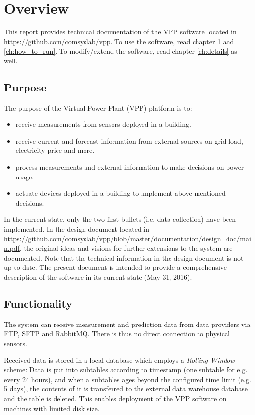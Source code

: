\chapter{Overview} \label{ch:overview}

This report provides technical documentation of the VPP software located in \url{https://github.com/comsyslab/vpp}. To use the software, read chapter \ref{ch:overview} and \ref{ch:how_to_run}. To modify/extend the software, read chapter \ref{ch:details} as well.

\section{Purpose}

The purpose of the Virtual Power Plant (VPP) platform is to:
\begin{itemize}

	\item receive measurements from sensors deployed in a building.
	\item receive current and forecast information from external sources on grid load, electricity price and more.
	\item process measurements and external information to make decisions on power usage.
	\item actuate devices deployed in a building to implement above mentioned decisions.
\end{itemize} 

In the current state, only the two first bullets (i.e. data collection) have been implemented. In the design document located in \url{https://github.com/comsyslab/vpp/blob/master/documentation/design_doc/main.pdf}, the original ideas and visions for further extensions to the system are documented. Note that the technical information in the design document is not up-to-date. The present document is intended to provide a comprehensive description of the software in its current state (May 31, 2016).

\section{Functionality}
The system can receive measurement and prediction data from data providers via FTP, SFTP and RabbitMQ. There is thus no direct connection to physical sensors. 

Received data is stored in a local database which employs a \emph{Rolling Window} scheme: Data is put into subtables according to timestamp (one subtable for e.g. every 24 hours), and when a subtables ages beyond the configured time limit (e.g. 5 days), the contents of it is transferred to the external data warehouse database and the table is deleted. This enables deployment of the VPP software on machines with limited disk size.

